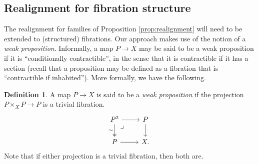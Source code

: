 \documentclass[12pt]{article}
\newcommand{\ra}{\ensuremath{\rightarrow}}
\renewcommand{\to}{\ensuremath{\rightarrow}}
\newcommand{\V}{\ensuremath{\mathcal{V}}}
\newcommand{\VV}{\ensuremath{\dot{\mathcal{V}}}}
\newcommand{\Fib}{\ensuremath{\mathsf{Fib}}}
\newcommand{\FFib}{\ensuremath{\dot{\mathsf{Fib}}}}
\newtheorem{lemma}[theorem]{Lemma}
\theoremstyle{remark}
\theoremstyle{definition}
\newtheorem{definition}[theorem]{Definition}
\newcommand{\pbmark}{\ar[dr, phantom, "\lrcorner" very near start, shift right=.5ex]}	%
\begin{document}


\subsection{Realignment for fibration structure}\label{sec:realignment}

The realignment for families of Proposition \ref{prop:realignment} will need to be extended to (structured) fibrations. Our approach makes use of the notion of a \emph{weak proposition}.  Informally, a map $P\to X$ may be said to be a weak proposition if it is ``conditionally contractible'', in the sense that it is contractible if it has a section (recall that a proposition may be defined as a fibration that is ``contractible if inhabited'').  More formally, we have the following.

\begin{definition}
A map $P\to X$ is said to be a \emph{weak proposition} if the projection $P\times_X P\to P$ is a trivial fibration.
\begin{equation}\label{diagram:weakprop}
\begin{tikzcd}
P^2 \ar[d,two heads,swap,"{\sim}"] \ar[r]  \pbmark & P \ar[d] \\
P \ar[r] &  X.
\end{tikzcd}
\end{equation}
Note that if either projection is a trivial fibration, then both are.
\end{definition}
\end{document}
